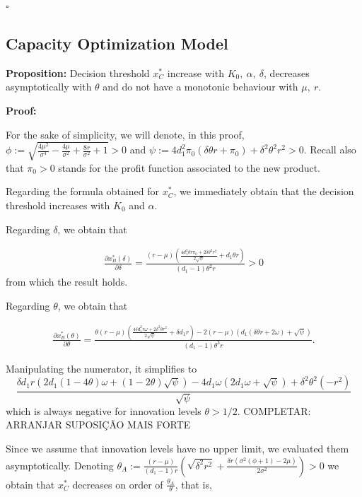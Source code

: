 \begin{flushright}
	$\square$
\end{flushright}




\subsection{Capacity Optimization Model}

\textbf{Proposition:}
Decision threshold $x^*_C$ increase with $K_0, \ \alpha, \ \delta$, decreases asymptotically with $\theta$ and do not have a monotonic behaviour with $\mu, \ r$.


\textbf{Proof:}

For the sake of simplicity, we will denote, in this proof, 
$\phi:=\sqrt{\frac{4 \mu ^2}{\sigma ^4}-\frac{4 \mu }{\sigma ^2}+\frac{8 r}{\sigma ^2}+1}>0$ and
$\psi:=4 d_1^2 \pi_0  (\delta  \theta  r+\pi_0 )+\delta ^2 \theta ^2 r^2>0$.
Recall also that $\pi_0>0$ stands for the profit function associated to the new product.

Regarding the formula obtained for  $x^*_C$, we immediately obtain that the decision threshold increases with $K_0$ and $\alpha$.


Regarding $\delta$, we obtain that

\begin{align*}
\frac{\partial x^*_B ( \delta ) }{\partial \delta}= \frac{(r-\mu ) \left(\frac{4 d_1^2 \theta  r \pi_0 +2 \delta  \theta ^2 r^2}{2 \sqrt{\psi }}+d_1 \theta  r\right)}{(d_1-1) \theta ^2 r}>0
\end{align*}
from which the result holds.

Regarding $\theta$, we obtain that

\begin{align*}
\frac{\partial x^*_B ( \theta) }{\partial \theta}= \frac{ \theta (r-\mu ) \left(\frac{4 \delta  d_1^2 r \omega +2 \delta ^2 \theta  r^2}{2 \sqrt{\psi }}+\delta  d_1 r\right)- 2 (r-\mu ) \left(d_1 (\delta  \theta  r+2 \omega )+\sqrt{\psi }\right)}{(d_1-1) \theta ^3 r}.
\end{align*}

Manipulating the numerator, it simplifies to
$$
\frac{\delta  d_1 r \left(2 d_1 (1-4 \theta ) \omega +(1-2 \theta ) \sqrt{\psi }\right)-4 d_1 \omega  \left(2 d_1 \omega +\sqrt{\psi }\right)+\delta ^2 \theta ^2 \left(-r^2\right)}{\sqrt{\psi}}$$
which is always negative for innovation levels $\theta>1/2$. COMPLETAR: ARRANJAR SUPOSIÇÃO MAIS FORTE

Since we assume that innovation levels have no upper limit, we evaluated them asymptotically. Denoting $\theta_A:=\frac{(r-\mu )}{(d_1-1) r}  \left(\sqrt{\delta ^2 r^2}+\frac{\delta  r \left(\sigma ^2 (\phi +1)-2 \mu \right)}{2 \sigma ^2}\right)>0$ we obtain that $x^*_C$ decreases on order of $\frac{\theta_A}{\theta}$, that is,  

